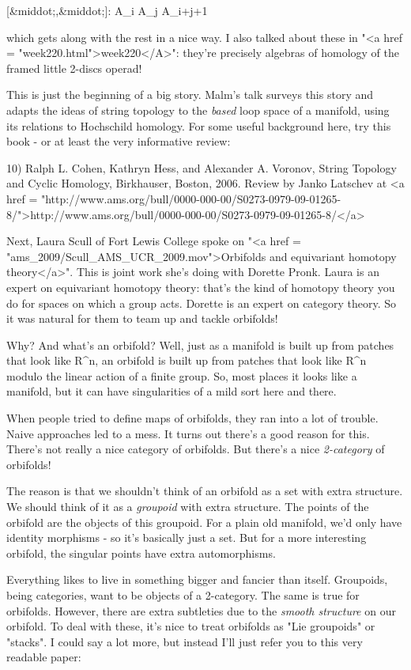 [&middot;,&middot;]: A_{i} \otimes  A_{j} \to  A_{i+j+1}

which gets along with the rest in a nice way.  I also talked about
these in "<a href = "week220.html">week220</A>": they're
precisely algebras of homology of the framed little 2-discs operad!

This is just the beginning of a big story.  Malm's talk surveys this
story and adapts the ideas of string topology to the \emph{based} loop 
space of a manifold, using its relations to Hochschild homology.
For some useful background here, try this book - or at least the
very informative review:

10) Ralph L. Cohen, Kathryn Hess, and Alexander A. Voronov, String
Topology and Cyclic Homology, Birkhauser, Boston, 2006.  Review by
Janko Latschev at <a href = "http://www.ams.org/bull/0000-000-00/S0273-0979-09-01265-8/">http://www.ams.org/bull/0000-000-00/S0273-0979-09-01265-8/</a>

Next, Laura Scull of Fort Lewis College spoke on 
"<a href = "ams_2009/Scull_AMS_UCR_2009.mov">Orbifolds 
and equivariant homotopy
theory</a>".  This is joint work she's doing with Dorette Pronk.
Laura is an expert on equivariant homotopy theory: that's the kind of
homotopy theory you do for spaces on which a group acts.  Dorette is
an expert on category theory.  So it was natural for them to team up
and tackle orbifolds!

Why?  And what's an orbifold?  Well, just as a manifold is built up
from patches that look like R^{n}, an orbifold is built up
from patches that look like R^{n} modulo the linear action of
a finite group.  So, most places it looks like a manifold, but it can
have singularities of a mild sort here and there.

When people tried to define maps of orbifolds, they ran into a lot of
trouble.  Naive approaches led to a mess.  It turns out there's a good
reason for this.  There's not really a nice category of orbifolds.
But there's a nice \emph{2-category} of orbifolds!

The reason is that we shouldn't think of an orbifold as a set with
extra structure.  We should think of it as a \emph{groupoid} with extra
structure.  The points of the orbifold are the objects of this
groupoid.  For a plain old manifold, we'd only have identity
morphisms - so it's basically just a set.  But for a more interesting
orbifold, the singular points have extra automorphisms.

Everything likes to live in something bigger and fancier than itself.
Groupoids, being categories, want to be objects of a 2-category.  The
same is true for orbifolds.  However, there are extra subtleties due
to the \emph{smooth structure} on our orbifold.  To deal with these,
it's nice to treat orbifolds as "Lie groupoids" or
"stacks".  I could say a lot more, but instead I'll just
refer you to this very readable paper:

